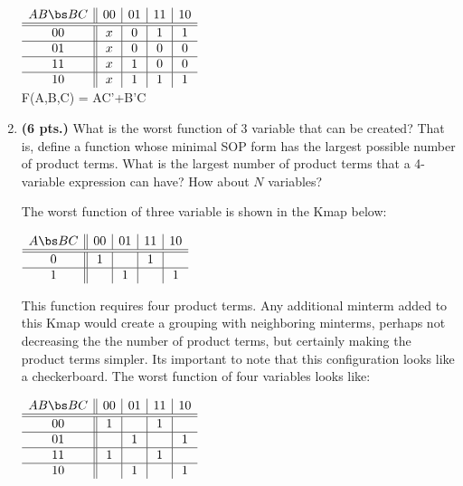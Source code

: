 \begin{enumerate}
\begin{solution}{
$\begin{array} {c||c|c|c|c}
   A B \bs B C   & 00 & 01 & 11 & 10 \\ \hline \hline
       00        & x  & 0  & 1  & 1  \\ \hline
       01        & x  & 0  & 0  & 0  \\ \hline
       11        & x  & 1  & 0  & 0  \\ \hline
       10        & x  & 1  & 1  & 1  \\
\end{array}$  \\
F(A,B,C) = AC'+B'C
} \end{solution}

\item {\bf (6 pts.)} What is the worst function \SOPmin of 3 variable 
that can be created?  That is, define a function whose minimal SOP form 
has the largest possible number of product terms.  What is the largest 
number of product terms that a 4-variable \SOPmin expression can 
have?  How about $N$ variables?

\begin{solution}{
The worst function of three variable is shown in the Kmap below:

$\begin{array} {c||c|c|c|c}
   A \bs B C   & 00 & 01 & 11 & 10 \\ \hline \hline
      0        & 1  &    & 1  &    \\ \hline
      1        &    & 1  &    & 1  \\ 
\end{array}$

This function requires four product terms.  Any additional minterm added to 
this Kmap would create a grouping with neighboring minterms, perhaps not 
decreasing the
the number of product terms, but certainly making the product terms simpler.
Its important to note that this configuration looks like a checkerboard.
The worst function of four variables looks like:

$\begin{array} {c||c|c|c|c}
   A B \bs B C   & 00 & 01 & 11 & 10 \\ \hline \hline
       00        & 1  &    & 1  &    \\ \hline
       01        &    & 1  &    & 1  \\ \hline
       11        & 1  &    & 1  &    \\ \hline
       10        &    & 1  &    & 1  \\
\end{array}$

}
\end{solution}
\end{enumerate}
